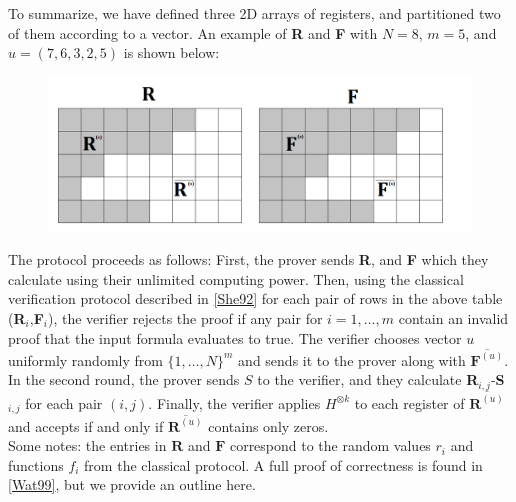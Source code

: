 \documentclass[12pt]{article}
\begin{document}
	To summarize, we have defined three 2D arrays of registers, and partitioned two of them according to a vector. An example of \textbf{R} and \textbf{F} with $N=8$, $m=5$, and $u=(7,6,3,2,5)$ is shown below:
	\begin{figure}[h!]
		\centering
		\includegraphics[width=\linewidth]{R grid.png}
	\end{figure}
	
	The protocol proceeds as follows: First, the prover sends \textbf{R}, and \textbf{F} which they calculate using their unlimited computing power. Then, using the classical verification protocol described in \hyperref[she92]{[She92]} for each pair of rows in the above table (\textbf{R}$_i$,\textbf{F}$_i$), the verifier rejects the proof if any pair for $i=1,\dots,m$ contain an invalid proof that the input formula evaluates to true. The verifier chooses vector $u$ uniformly randomly from $\{1,\dots,N\}^m$ and sends it to the prover along with $\overline{\textbf{F}^{(u)}}$. In the second round, the prover sends $S$ to the verifier, and they calculate \textbf{R}$_{i,j}$-\textbf{S}$_{i,j}$ for each pair $(i,j)$. Finally, the verifier applies $H^{\otimes k}$ to each register of $\overline{\textbf{R}^{(u)}}$ and accepts if and only if $\overline{\textbf{R}^{(u)}}$ contains only zeros.\\
	
	Some notes: the entries in $\textbf{R}$ and $\textbf{F}$ correspond to the random values $r_i$ and functions $f_i$ from the classical protocol. A full proof of correctness is found in \hyperref[wat99]{[Wat99]}, but we provide an outline here.
	
\end{document}
